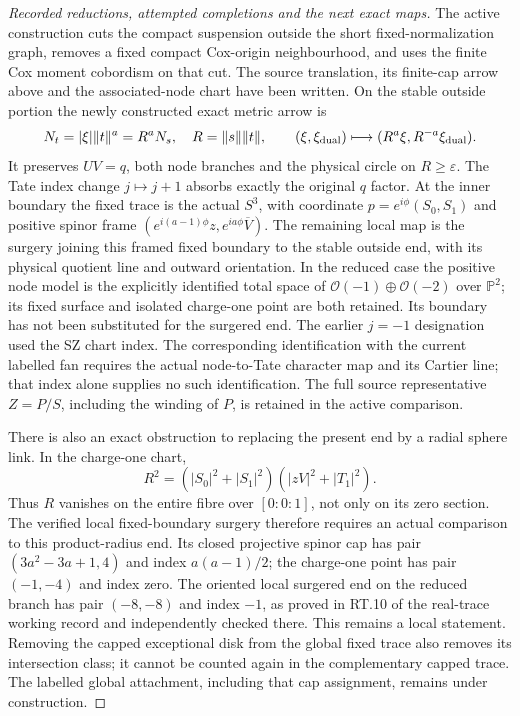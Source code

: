 \begin{proof}[Recorded reductions, attempted completions and the next exact maps]
The active construction cuts the compact suspension outside
the short fixed-normalization graph, removes a fixed compact
Cox-origin neighbourhood, and uses the finite Cox moment
cobordism on that cut. The source translation, its finite-cap
arrow above and the associated-node chart have been written.
On the stable outside portion the newly constructed exact
metric arrow is
\[
 N_t=|\xi|\|t\|^a=R^aN_s,\quad R=\|s\|\|t\|,\qquad
 (\xi,\xi_{\rm dual})\longmapsto
 (R^a\xi,R^{-a}\xi_{\rm dual}).
\]
It preserves \(UV=q\), both node branches and the physical
circle on \(R\ge\varepsilon\). The Tate index change
\(j\mapsto j+1\) absorbs exactly the original \(q\)
factor. At the inner boundary the fixed trace is the actual
\(S^3\), with coordinate \(p=e^{i\phi}(S_0,S_1)\) and
positive spinor frame
\((e^{i(a-1)\phi}z,e^{ia\phi}\overline V)\).
The remaining local map is the surgery joining this framed
fixed boundary to the stable outside end, with its physical
quotient line and outward orientation. In the reduced case
the positive node model is the explicitly identified total
space of \(\mathcal O(-1)\oplus\mathcal O(-2)\) over
\(\mathbb P^2\); its fixed surface and isolated
charge-one point are both retained. Its boundary has not
been substituted for the surgered end. The earlier \(j=-1\)
designation used the SZ chart index. The corresponding
identification with the current labelled fan requires the
actual node-to-Tate character map and its Cartier line;
that index alone supplies no such identification. The
full source representative \(Z=P/S\), including the
winding of \(P\), is retained in the active comparison.

There is also an exact obstruction to replacing the present
end by a radial sphere link. In the charge-one chart,
\[
 R^2=(|S_0|^2+|S_1|^2)(|zV|^2+|T_1|^2).
\]
Thus \(R\) vanishes on the entire fibre over
\([0:0:1]\), not only on its zero section. The verified
local fixed-boundary surgery therefore requires an actual
comparison to this product-radius end. Its closed
projective spinor cap has pair
\((3a^2-3a+1,4)\) and index \(a(a-1)/2\);
the charge-one point has pair \((-1,-4)\) and index zero.
The oriented local surgered end on the reduced branch
has pair \((-8,-8)\) and index \(-1\), as proved in
RT.10 of the real-trace working record and independently
checked there. This remains a local statement. Removing
the capped exceptional disk from the global fixed trace
also removes its intersection class; it cannot be counted
again in the complementary capped trace. The labelled
global attachment, including that cap assignment, remains
under construction.


\end{proof}

